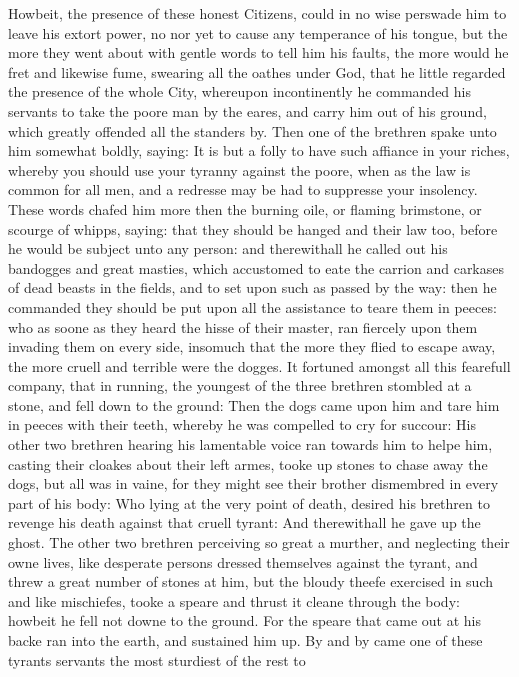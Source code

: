 Howbeit, the presence of these honest Citizens, could in no wise perswade him
to leave his extort power, no nor yet to cause any temperance of his tongue,
but the more they went about with gentle words to tell him his faults, the more
would he fret and likewise fume, swearing all the oathes under God, that he
little regarded the presence of the whole City, whereupon incontinently he
commanded his servants to take the poore man by the eares, and carry him out of
his ground, which greatly offended all the standers by. Then one of the
brethren spake unto him somewhat boldly, saying: It is but a folly to have such
affiance in your riches, whereby you should use your tyranny against the poore,
when as the law is common for all men, and a redresse may be had to suppresse
your insolency. These words chafed him more then the burning oile, or flaming
brimstone, or scourge of whipps, saying: that they should be hanged and their
law too, before he would be subject unto any person: and therewithall he called
out his bandogges and great masties, which accustomed to eate the carrion and
carkases of dead beasts in the fields, and to set upon such as passed by the
way: then he commanded they should be put upon all the assistance to teare them
in peeces: who as soone as they heard the hisse of their master, ran fiercely
upon them invading them on every side, insomuch that the more they flied to
escape away, the more cruell and terrible were the dogges. It fortuned amongst
all this fearefull company, that in running, the youngest of the three brethren
stombled at a stone, and fell down to the ground: Then the dogs came upon him
and tare him in peeces with their teeth, whereby he was compelled to cry for
succour: His other two brethren hearing his lamentable voice ran towards him to
helpe him, casting their cloakes about their left armes, tooke up stones to
chase away the dogs, but all was in vaine, for they might see their brother
dismembred in every part of his body: Who lying at the very point of death,
desired his brethren to revenge his death against that cruell tyrant: And
therewithall he gave up the ghost. The other two brethren perceiving so great
a murther, and neglecting their owne lives, like desperate persons dressed
themselves against the tyrant, and threw a great number of stones at him, but
the bloudy theefe exercised in such and like mischiefes, tooke a speare and
thrust it cleane through the body: howbeit he fell not downe to the ground. For
the speare that came out at his backe ran into the earth, and sustained him up.
By and by came one of these tyrants servants the most sturdiest of the rest to
